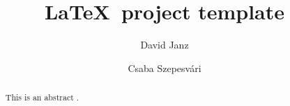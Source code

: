 \documentclass[11pt,a4paper]{article}
\title{\textbf{\LaTeX~project template}}
\author[1]{David Janz}
\author[2]{Csaba Szepesvári}
\affil[1]{University of Oxford}
\affil[2]{University of Alberta}
\date{}
\begin{document}
\maketitle

\begin{abstract}
    This is an abstract \citep{janz2022sequential}.
\end{abstract}



\printbibliography
\newpage

\appendix

\end{document}
